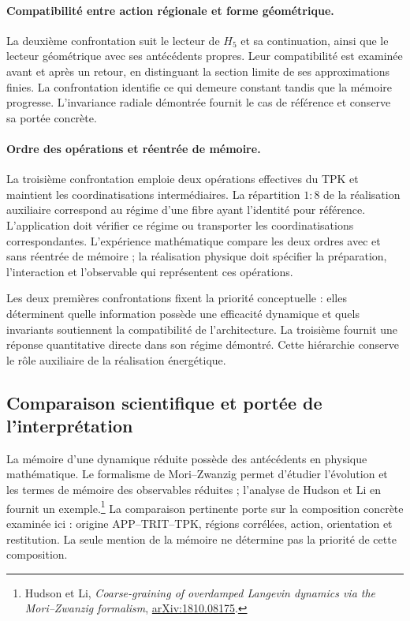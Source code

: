 \paragraph{Compatibilité entre action régionale et forme géométrique.}
La deuxième confrontation suit le lecteur de $H_5$ et sa continuation, ainsi que le lecteur géométrique avec ses antécédents propres. Leur compatibilité est examinée avant et après un retour, en distinguant la section limite de ses approximations finies. La confrontation identifie ce qui demeure constant tandis que la mémoire progresse. L'invariance radiale démontrée fournit le cas de référence et conserve sa portée concrète.

\paragraph{Ordre des opérations et réentrée de mémoire.}
La troisième confrontation emploie deux opérations effectives du TPK et maintient les coordinatisations intermédiaires. La répartition $1:8$ de la réalisation auxiliaire correspond au régime d'une fibre ayant l'identité pour référence. L'application doit vérifier ce régime ou transporter les coordinatisations correspondantes. L'expérience mathématique compare les deux ordres avec et sans réentrée de mémoire ; la réalisation physique doit spécifier la préparation, l'interaction et l'observable qui représentent ces opérations.

Les deux premières confrontations fixent la priorité conceptuelle : elles déterminent quelle information possède une efficacité dynamique et quels invariants soutiennent la compatibilité de l'architecture. La troisième fournit une réponse quantitative directe dans son régime démontré. Cette hiérarchie conserve le rôle auxiliaire de la réalisation énergétique.

\subsection{Comparaison scientifique et portée de l'interprétation}
\label{md:lectin:comparacion}

La mémoire d'une dynamique réduite possède des antécédents en physique mathématique. Le formalisme de Mori--Zwanzig permet d'étudier l'évolution et les termes de mémoire des observables réduites ; l'analyse de Hudson et Li en fournit un exemple.\footnote{Hudson et Li,
\emph{Coarse-graining of overdamped Langevin dynamics via the
Mori--Zwanzig formalism},
\href{https://arxiv.org/abs/1810.08175}{arXiv:1810.08175}.}
La comparaison pertinente porte sur la composition concrète examinée ici : origine APP--TRIT--TPK, régions corrélées, action, orientation et restitution. La seule mention de la mémoire ne détermine pas la priorité de cette composition.

